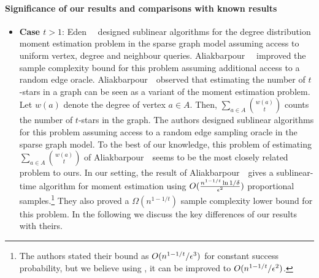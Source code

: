 \paragraph*{Significance of our results and comparisons with known results} 
\begin{itemize}

	\item {\bf Case $t>1$}: Eden~\etal~\cite{ERS2018,ERS2019} designed sublinear algorithms for the degree distribution moment estimation problem in the sparse graph model assuming access to uniform vertex, degree and neighbour queries. Aliakbarpour~\etal~\cite{ABGPRY2018} improved the sample complexity bound for this problem assuming additional access to a random edge oracle. Aliakbarpour~\etal~observed that estimating the number of $t$-stars in a graph can be seen as a variant of the moment estimation problem. Let $w(a)$ denote the degree of vertex $a\in A$. Then, $\sum_{a \in A}\binom {w(a)}t$ counts the number of $t$-stars in the graph. The authors designed sublinear algorithms for this problem assuming access to a random edge sampling oracle in the sparse graph model. To the best of our knowledge, this problem of estimating $\sum_{a\in A} {w(a)\choose t}$ of Aliakbarpour~\etal~seems to be the most closely related problem to ours. In our setting, the result of Aliakbarpour~\etal~gives a sublinear-time algorithm for moment estimation using $O(\frac{n^{1-1/t}\ln 1/\delta}{\epsilon^2})$ proportional samples.\footnote{The authors stated their bound as $O(n^{1-1/t}/\epsilon^3)$ for constant success probability, but we believe using \cite{BT2022}, it can be improved to $O(n^{1-1/t}/\epsilon^2)$.} They also proved a $\Omega(n^{1-1/t})$ sample complexity lower bound for this problem. In the following we discuss the key differences of our results with theirs.


\end{itemize}
